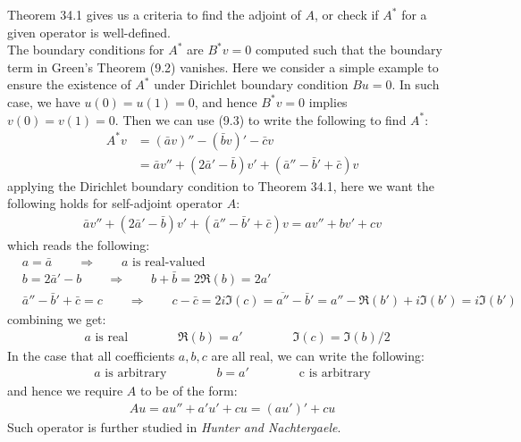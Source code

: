 \documentclass[11pt]{book}
\theoremstyle{break}
\theoremstyle{break}
\newcommand{\txt}{\textit{Hunter and Nachtergaele}}
\begin{document}
Theorem 34.1 gives us a criteria to find the adjoint of $A$, or check if $A^*$ for a given operator is well-defined.\\

The boundary conditions for $A^*$ are $B^* v = 0$ computed such that the boundary term in Green's Theorem (9.2) vanishes. Here we consider a simple example to ensure the existence of $A^*$ under Dirichlet boundary condition $Bu = 0$. In such case, we have $u(0) = u(1) = 0$, and hence $B^*v = 0$ implies $v(0) = v(1) = 0$. Then we can use (9.3) to write the following to find $A^*$:
\begin{align*}
A^*v 
&= (\bar{a}v)'' - (\bar{b}v)' - \bar{c}v \\
&= \bar{a}v'' + (2\bar{a}' - \bar{b})v' + (\bar{a}'' -\bar{b}' + \bar{c})v
\end{align*}
applying the Dirichlet boundary condition to Theorem 34.1, here we want the following holds for self-adjoint operator $A$:
\begin{align*}
 \bar{a}v'' + (2\bar{a}' - \bar{b})v' + (\bar{a}'' -\bar{b}' + \bar{c})v = av'' + bv' + cv
\end{align*}
which reads the following:
\begin{align*}
&a = \bar{a} \qquad \Rightarrow \qquad a\text{ is real-valued}\\
&b = 2\bar{a}' - b \qquad \Rightarrow \qquad b + \bar{b} = 2\Re(b) = 2a'\\
&\bar{a}'' - \bar{b}' + \bar{c} = c	 \qquad \Rightarrow \qquad c-\bar{c} = 2i \Im(c) = \overline{a''} - \bar{b}'  = a''-\Re(b') + i\Im(b') = i\Im(b')
\end{align*}
combining we get:
\begin{align*}
&a \text{ is real}\qquad\qquad
\Re(b) = a'\qquad\qquad
\Im(c) = \Im(b) / 2
\end{align*}
In the case that all coefficients $a,b,c$ are all real, we can write the following:
\begin{align*}
a \text{ is arbitrary} \qquad\qquad  b = a' \qquad\qquad \text{c is arbitrary}
\end{align*}
and hence we require $A$ to be of the form:
\begin{align*}
A u = au'' + a'u' +cu = (au')' + cu \tag{Sturm Liouville Operator $A$}
\end{align*}
Such operator is further studied in \txt.
\end{document}
